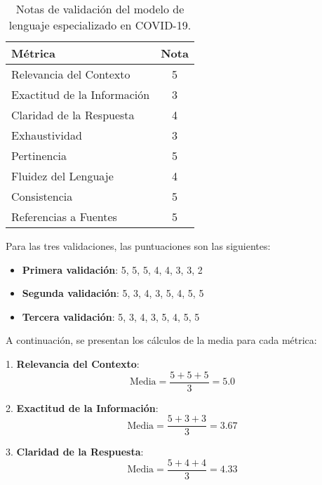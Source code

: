 \begin{table}[h]
    \centering
    \begin{adjustbox}{max width=\textwidth}
    \begin{tabular}{|l|c|}
        \hline
        \textbf{Métrica} & \textbf{Nota} \\
        \hline
        Relevancia del Contexto & 5 \\
        \hline
        Exactitud de la Información & 3 \\
        \hline
        Claridad de la Respuesta & 4 \\
        \hline
        Exhaustividad & 3 \\
        \hline
        Pertinencia & 5 \\
        \hline
        Fluidez del Lenguaje & 4 \\
        \hline
        Consistencia & 5 \\
        \hline
        Referencias a Fuentes & 5 \\
        \hline
    \end{tabular}
    \end{adjustbox}
    \caption{Notas de validación del modelo de lenguaje especializado en COVID-19.}
    \label{tab:validation_scorest3}
\end{table}

Para las tres validaciones, las puntuaciones son las siguientes:

\begin{itemize}
    \item \textbf{Primera validación}: 5, 5, 5, 4, 4, 3, 3, 2
    \item \textbf{Segunda validación}: 5, 3, 4, 3, 5, 4, 5, 5
    \item \textbf{Tercera validación}: 5, 3, 4, 3, 5, 4, 5, 5
\end{itemize}

A continuación, se presentan los cálculos de la media para cada métrica:

1. \textbf{Relevancia del Contexto}:
\begin{equation}
\text{Media} = \frac{5 + 5 + 5}{3} = 5.0
\end{equation}

2. \textbf{Exactitud de la Información}:
\begin{equation}
\text{Media} = \frac{5 + 3 + 3}{3} = 3.67
\end{equation}

3. \textbf{Claridad de la Respuesta}:
\begin{equation}
\text{Media} = \frac{5 + 4 + 4}{3} = 4.33
\end{equation}

